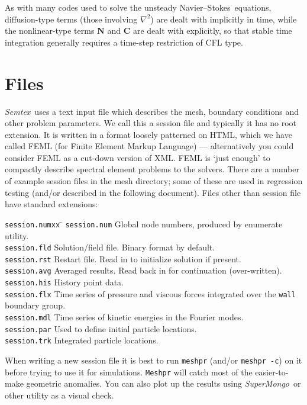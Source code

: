 \documentclass[11pt]{report}
\newcommand{\Semtex}{\emph{Semtex}} \newcommand{\Dog}{\emph{Dog}}
\newcommand{\SM}{\emph{SuperMongo}}
\newcommand\NavSto{Navier--Stokes}
\begin{document}
As with many codes used to solve the unsteady \NavSto\ equations,
diffusion-type terms (those involving $\nabla^2$) are dealt with
implicitly in time, while the nonlinear-type terms $\bm{N}$ and
$\bm{C}$ are dealt with explicitly, so that stable time integration
generally requires a time-step restriction of CFL type.

\section{Files}

\Semtex\ uses a text input file which describes the mesh, boundary
conditions and other problem parameters.  We call this a session file
and typically it has no root extension.  It is written in a format
loosely patterned on HTML, which we have called FEML (for Finite
Element Markup Language) --- alternatively you could consider FEML as
a cut-down version of XML.  FEML is `just enough' to compactly
describe spectral element problems to the solvers.  There are a number
of example session files in the mesh directory; some of these are used
in regression testing (and/or described in the following document).
Files other than session file have standard extensions:
\begin{tabbing}
\texttt{session.numxx} \= \kill
\texttt{session.num}  \>
        Global node numbers, produced by enumerate utility.\\
\texttt{session.fld}  \>
        Solution/field file.  Binary format by default.\\
\texttt{session.rst}  \>
        Restart file. Read in to initialize solution if present.\\
\texttt{session.avg} \> Averaged results. Read back in for
        continuation (over-written).\\
\texttt{session.his} \> History point data.\\
\texttt{session.flx} \> Time series of pressure and viscous forces
        integrated over the \texttt{wall} boundary group.\\
\texttt{session.mdl} \> Time series of kinetic energies in the Fourier modes.\\
\texttt{session.par} \> Used to define initial particle locations.\\
\texttt{session.trk} \> Integrated particle locations.\\
\end{tabbing}
When writing a new session file it is best to run \texttt{meshpr}
(and/or \texttt{meshpr -c}) on it before trying to use it for
simulations.  \texttt{Meshpr} will catch most of the easier-to-make
geometric anomalies.  You can also plot up the results using \SM\ or other
utility as a visual check.
\end{document}
